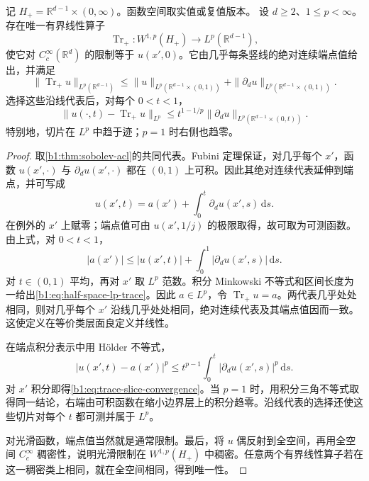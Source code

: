 \begin{theorem}[半空间的 \(L^p\) 迹]\label{b1:thm:half-space-lp-trace}
记 \(H_+=\mathbb R^{d-1}\times(0,\infty)\)。函数空间取实值或复值版本。
设 \(d\ge2\)、\(1\le p<\infty\)。存在唯一有界线性算子
\[
 \operatorname{Tr}_+:W^{1,p}(H_+)\longrightarrow L^p(\mathbb R^{d-1}),
\]
使它对 \(C_c^\infty(\mathbb R^d)\) 的限制等于 \(u(x',0)\)。它由几乎每条竖线的绝对连续端点值给出，并满足
\begin{equation}\label{b1:eq:half-space-lp-trace}
 \|\operatorname{Tr}_+u\|_{L^p(\mathbb R^{d-1})}
 \le\|u\|_{L^p(\mathbb R^{d-1}\times(0,1))}
      +\|\partial_du\|_{L^p(\mathbb R^{d-1}\times(0,1))}.
\end{equation}
选择这些沿线代表后，对每个 \(0<t<1\)，
\begin{equation}\label{b1:eq:trace-slice-convergence}
 \|u(\cdot,t)-\operatorname{Tr}_+u\|_{L^p}
 \le t^{1-1/p}
       \|\partial_du\|_{L^p(\mathbb R^{d-1}\times(0,t))}.
\end{equation}
特别地，切片在 \(L^p\) 中趋于迹；\(p=1\) 时右侧也趋零。
\end{theorem}
\begin{proof}
取\cref{b1:thm:sobolev-acl}的共同代表。Fubini 定理保证，对几乎每个 \(x'\)，函数 \(u(x',\cdot)\) 与 \(\partial_du(x',\cdot)\) 都在 \((0,1)\) 上可积。因此其绝对连续代表延伸到端点，并可写成
\[
 u(x',t)=a(x')+\int_0^t\partial_du(x',s)\,\mathrm ds.
\]
在例外的 \(x'\) 上赋零；端点值可由 \(u(x',1/j)\) 的极限取得，故可取为可测函数。由上式，对 \(0<t<1\)，
\[
 |a(x')|\le |u(x',t)|
                  +\int_0^1|\partial_du(x',s)|\,\mathrm ds.
\]
对 \(t\in(0,1)\) 平均，再对 \(x'\) 取 \(L^p\) 范数。积分 Minkowski 不等式和区间长度为一给出\eqref{b1:eq:half-space-lp-trace}。因此 \(a\in L^p\)，令 \(\operatorname{Tr}_+u=a\)。两代表几乎处处相同，则对几乎每个 \(x'\) 沿线几乎处处相同，绝对连续代表及其端点值因而一致。这使定义在等价类层面良定义并线性。

在端点积分表示中用 Hölder 不等式，
\[
 |u(x',t)-a(x')|^p
 \le t^{p-1}\int_0^t|\partial_du(x',s)|^p\,\mathrm ds.
\]
对 \(x'\) 积分即得\eqref{b1:eq:trace-slice-convergence}。当 \(p=1\) 时，用积分三角不等式取得同一结论，右端由可积函数在缩小边界层上的积分趋零。沿线代表的选择还使这些切片对每个 \(t\) 都可测并属于 \(L^p\)。

对光滑函数，端点值当然就是通常限制。最后，将 \(u\) 偶反射到全空间，再用全空间 \(C_c^\infty\) 稠密性，说明光滑限制在 \(W^{1,p}(H_+)\) 中稠密。任意两个有界线性算子若在这一稠密类上相同，就在全空间相同，得到唯一性。
\end{proof}


